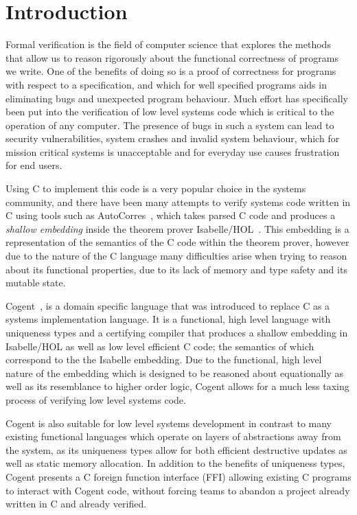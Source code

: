 \chapter{Introduction}\label{ch:intro}

Formal verification is the field of computer science that explores the methods that allow us to
  reason rigorously about the functional correctness of programs we write.
One of the benefits of doing so is a proof of correctness for programs with respect to a specification,
  and which for well specified programs aids in eliminating bugs and unexpected program behaviour.
Much effort has specifically been put into the verification of low level systems code
  which is critical to the operation of any computer.
The presence of bugs in such a system can lead to security vulnerabilities,
  system crashes and invalid system behaviour, which for mission critical systems is unacceptable and
  for everyday use causes frustration for end users.

Using C to implement this code is a very popular choice in the systems community,
  and there have been many attempts to verify systems code written in C using tools such as 
  AutoCorres~\citep{AutoCorres}, which takes parsed C code and produces a \textit{shallow embedding}
  inside the theorem prover Isabelle/HOL~\citep{IsabelleTutorial}.
This embedding is a representation of the semantics of the C code within the theorem prover,
  however due to the nature of the C language many difficulties arise when trying to
  reason about its functional properties, due to its lack of memory and type safety 
  and its mutable state.

Cogent~\citep{ICFPCogent}, is a domain specific language that was introduced to replace C as a systems
  implementation language.
It is a functional, high level language with uniqueness types and a certifying compiler
  that produces a shallow embedding in Isabelle/HOL as well as low level efficient C code;
  the semantics of which correspond to the the Isabelle embedding.
Due to the functional, high level nature of the embedding\liam{,}
  which is designed to be reasoned about equationally\liam{,} as well as its resemblance to higher order logic,
  Cogent allows for a much less taxing process of verifying low level systems code.

Cogent is also suitable for low level systems development in contrast to many existing functional languages which operate
  on layers of abstractions away from the system, as its uniqueness types allow for both efficient destructive updates
  as well as static memory allocation.
In addition to the benefits of uniqueness types, Cogent presents a C foreign function interface (FFI) allowing existing C programs
 to interact with Cogent code, without forcing teams to abandon a project already written in C and already verified.

